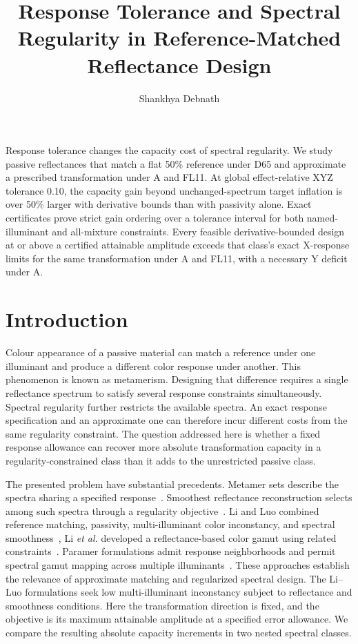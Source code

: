 \documentclass{optica-article}
\begin{document}
\title{Response Tolerance and Spectral Regularity in Reference-Matched Reflectance Design}
\author{Shankhya Debnath}
\address{Department of Printing Technology, Regional Institute of Printing Technology, Kolkata, India}

\begin{abstract*}
Response tolerance changes the capacity cost of spectral regularity. We study passive reflectances that match a flat 50\% reference under D65 and approximate a prescribed transformation under A and FL11. At global effect-relative XYZ tolerance 0.10, the capacity gain beyond unchanged-spectrum target inflation is over 50\% larger with derivative bounds than with passivity alone. Exact certificates prove strict gain ordering over a tolerance interval for both named-illuminant and all-mixture constraints. Every feasible derivative-bounded design at or above a certified attainable amplitude exceeds that class's exact X-response limits for the same transformation under A and FL11, with a necessary Y deficit under A.
\end{abstract*}
\thispagestyle{plain}

\section{Introduction}
Colour appearance of a passive material can match a reference under one illuminant and produce a different color response under another. This phenomenon is known as metamerism. Designing that difference requires a single reflectance spectrum to satisfy several response constraints simultaneously. Spectral regularity further restricts the available spectra. An exact response specification and an approximate one can therefore incur different costs from the same regularity constraint. The question addressed here is whether a fixed response allowance can recover more absolute transformation capacity in a regularity-constrained class than it adds to the unrestricted passive class.

The presented problem have substantial precedents. Metamer sets describe the spectra sharing a specified response~\cite{Finlayson2005}. Smoothest reflectance reconstruction selects among such spectra through a regularity objective~\cite{vanTrigt1990,Burns2020}. Li and Luo combined reference matching, passivity, multi-illuminant color inconstancy, and spectral smoothness~\cite{Li2006}, Li \emph{et al.} developed a reflectance-based color gamut using related constraints~\cite{Li2007}. Paramer formulations admit response neighborhoods and permit spectral gamut mapping across multiple illuminants~\cite{Urban2011,Morovic2021}. These approaches establish the relevance of approximate matching and regularized spectral design. The Li--Luo formulations seek low multi-illuminant inconstancy subject to reflectance and smoothness conditions. Here the transformation direction is fixed, and the objective is its maximum attainable amplitude at a specified error allowance. We compare the resulting absolute capacity increments in two nested spectral classes.
\end{document}
